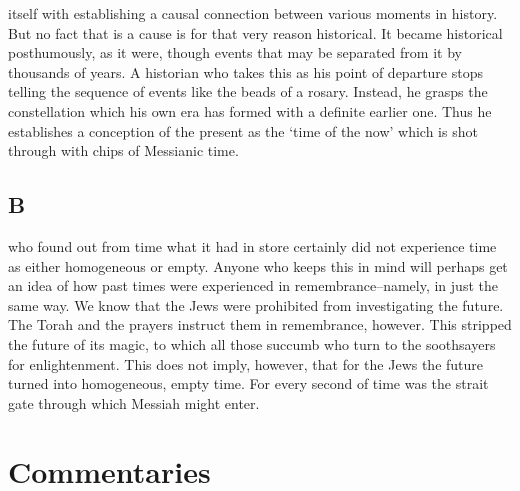 \documentclass[12pt]{tufte-handout}
\begin{document}
 itself with establishing a causal connection between various moments in history. But no fact that is a cause is for that very reason historical. It became historical posthumously, as it were, though events that may be separated from it by thousands of years. A historian who takes this as his point of departure stops telling the sequence of events like the beads of a rosary. Instead, he grasps the constellation which his own era has formed with a definite earlier one. Thus he establishes a conception of the present as the `time of the now' which is shot through with chips of Messianic time.	 
 	 	 
\subsection{B}	 
 	 	 
 who found out from time what it had in store certainly did not experience time as either homogeneous or empty. Anyone who keeps this in mind will perhaps get an idea of how past times were experienced in remembrance--namely, in just the same way. We know that the Jews were prohibited from investigating the future. The Torah and the prayers instruct them in remembrance, however. This stripped the future of its magic, to which all those succumb who turn to the soothsayers for enlightenment. This does not imply, however, that for the Jews the future turned into homogeneous, empty time. For every second of time was the strait gate through which Messiah might enter.	 

\section{Commentaries}
\end{document}
